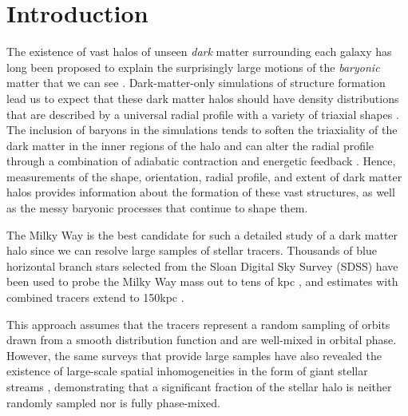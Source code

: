 \documentclass{emulateapj}
\begin{document}
\section{Introduction}
\label{intro.sec}
 The existence of vast halos of unseen {\it dark} matter surrounding each galaxy has long been proposed to explain the surprisingly large
motions of the {\it baryonic} matter that we can see \citep[e.g.,][]{rubin70}.
Dark-matter-only simulations of structure formation lead us to expect that these dark matter halos should have density distributions that are described by a universal radial profile \citep{navarro96} with a variety of triaxial shapes \citep{jing02}.
The inclusion of baryons in the simulations tends to soften the triaxiality of the dark matter in the inner regions of the halo \citep[e.g., as the disk forms,][]{bailin05} and
can alter the radial profile through a combination of adiabatic contraction and energetic feedback \citep[e.g.][]{pontzen12}.
Hence, measurements of the shape, orientation, radial profile, and extent of dark matter halos provides information about the formation of these vast structures, as well as the messy baryonic processes that continue to shape them.

The Milky Way is the best candidate for such a detailed study of a dark matter halo
since we can resolve large samples of stellar tracers.
Thousands of blue horizontal branch stars selected from the Sloan Digital Sky Survey (SDSS) have been used to probe the Milky Way mass out to tens of
kpc \citep[SDSS, see][]{deason12a,kafle12}, and estimates with combined tracers extend to 150kpc \citep{deason12b}.

This approach assumes that the tracers represent a random sampling of orbits drawn from a smooth distribution function and are well-mixed in orbital phase. However, the same surveys that provide large samples have also revealed the existence of large-scale spatial inhomogeneities in the form of giant stellar streams \citep{newberg02,majewski03,belokurov06}, demonstrating that a significant fraction of the stellar halo is neither randomly sampled nor is fully phase-mixed.
\end{document}
